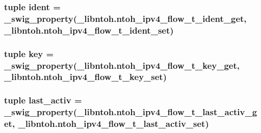 \hypertarget{classlibntoh_1_1ntoh__ipv4__flow__t_a219b3ba79a48452030ad36cf2519ee85}{
\subsubsection[{ident}]{\setlength{\rightskip}{0pt plus 5cm}tuple ident = {\bf \-\_\-swig\-\_\-property}(\-\_\-libntoh.\-ntoh\-\_\-ipv4\-\_\-flow\-\_\-t\-\_\-ident\-\_\-get, \-\_\-libntoh.\-ntoh\-\_\-ipv4\-\_\-flow\-\_\-t\-\_\-ident\-\_\-set)\hspace{0.3cm}{\ttfamily [static]}}}\label{classlibntoh_1_1ntoh__ipv4__flow__t_a219b3ba79a48452030ad36cf2519ee85}
\hypertarget{classlibntoh_1_1ntoh__ipv4__flow__t_a29eb8dd921f77e19e24a20bcd820c2ed}{
\subsubsection[{key}]{\setlength{\rightskip}{0pt plus 5cm}tuple key = {\bf \-\_\-swig\-\_\-property}(\-\_\-libntoh.\-ntoh\-\_\-ipv4\-\_\-flow\-\_\-t\-\_\-key\-\_\-get, \-\_\-libntoh.\-ntoh\-\_\-ipv4\-\_\-flow\-\_\-t\-\_\-key\-\_\-set)\hspace{0.3cm}{\ttfamily [static]}}}\label{classlibntoh_1_1ntoh__ipv4__flow__t_a29eb8dd921f77e19e24a20bcd820c2ed}
\hypertarget{classlibntoh_1_1ntoh__ipv4__flow__t_a43a06ba72aed8671dd1579dbf6f78b1a}{
\subsubsection[{last\-\_\-activ}]{\setlength{\rightskip}{0pt plus 5cm}tuple last\-\_\-activ = {\bf \-\_\-swig\-\_\-property}(\-\_\-libntoh.\-ntoh\-\_\-ipv4\-\_\-flow\-\_\-t\-\_\-last\-\_\-activ\-\_\-get, \-\_\-libntoh.\-ntoh\-\_\-ipv4\-\_\-flow\-\_\-t\-\_\-last\-\_\-activ\-\_\-set)\hspace{0.3cm}{\ttfamily [static]}}}\label{classlibntoh_1_1ntoh__ipv4__flow__t_a43a06ba72aed8671dd1579dbf6f78b1a}
